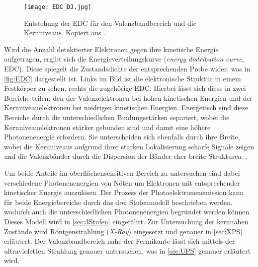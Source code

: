         \begin{figure}
            \centering
            \texttt{[image: EDC\_DJ.jpg]}
            \caption{Entstehung der EDC für den Valenzbandbereich und die Kernniveaus.
            Kopiert aus \cite{oura_surface_2003}.}
            \label{fig:EDC}
        \end{figure}
        Wird die Anzahl detektierter Elektronen gegen ihre kinetische Energie aufgetragen, ergibt sich die Energieverteilungskurve (\textit{energy distribution curve}, EDC).
        Diese spiegelt die Zustandsdichte der entsprechenden Probe wider, was in \autoref{fig:EDC} dargestellt ist.        
        Links im Bild ist die elektronische Struktur in einem Festkörper zu sehen, rechts die zugehörige EDC.
        Hierbei lässt sich diese in zwei Bereiche teilen, den der Valenzelektronen bei hohen kinetischen Energien und der Kernniveauelektronen bei niedrigen kinetischen Energien.
        Energetisch sind diese Bereiche durch die unterschiedlichen Bindungsstärken separiert, wobei die Kernniveauelektronen stärker gebunden sind und damit eine höhere Photonenenergie erfordern.
        Sie unterscheiden sich ebenfalls durch ihre Breite, wobei die Kernniveaus aufgrund ihrer starken Lokalisierung scharfe Signale zeigen und die Valenzbänder durch die Dispersion der Bänder eher breite Strukturen~\cite{Hüfner}.

        Um beide Anteile im oberflächensensitiven Bereich zu untersuchen sind dabei verschiedene Photonenenergien von Nöten um Elektronen mit entsprechender kinetischer Energie auszulösen.
        Der Prozess der Photoelektronenemission kann für beide Energiebereiche durch das drei Stufenmodell beschrieben werden, wodurch auch die unterschiedlichen Photonenenergien begründet werden können.
        Dieses Modell wird in \autoref{sec:3Stufen} eingeführt.
        Zur Untersuchung der kernnahen Zustände wird Röntgenstrahlung (\textit{X-Ray}) eingesetzt und genauer in \autoref{sec:XPS} erläutert.
        Der Valenzbandbereich nahe der Fermikante lässt sich mittels der ultravioletten Strahlung genauer untersuchen, was in \autoref{sec:UPS} genauer erläutert wird.


